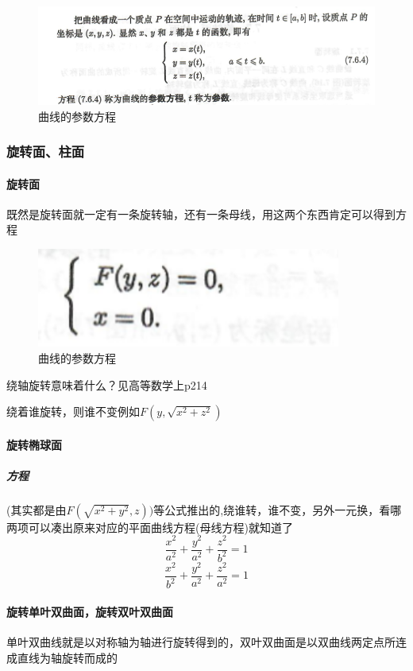 \documentclass[UTF8]{ctexart}
\begin{document}
    \begin{figure}[ht]
      \centering
      \includegraphics[width = 12cm]{../picturenote/参数方程.png}
      \caption{曲线的参数方程}
    \end{figure}


\subsubsection{旋转面、柱面}

\paragraph{旋转面}

既然是旋转面就一定有一条旋转轴，还有一条母线，用这两个东西肯定可以得到方程

  \begin{figure}[ht]
    \centering
    \includegraphics[width = 10cm]{../picturenote/旋转面参数方程.png}
    \caption{曲线的参数方程}
  \end{figure}

绕轴旋转意味着什么？见高等数学上p214

绕着谁旋转，则谁不变例如$F(y,\sqrt{x^2+z^2})$

\paragraph{旋转椭球面}

\subparagraph{方程}(其实都是由$F(\sqrt {x^2+y^2},z))$等公式推出的,绕谁转，谁不变，另外一元换，看哪两项可以凑出原来对应的平面曲线方程(母线方程)就知道了
$$\frac{x^2}{a^2}+\frac{y^2}{a^2}+\frac{z^2}{b^2} = 1$$
$$\frac{x^2}{b^2}+\frac{y^2}{a^2}+\frac{z^2}{a^2} = 1$$

\paragraph{旋转单叶双曲面，旋转双叶双曲面}
单叶双曲线就是以对称轴为轴进行旋转得到的，双叶双曲面是以双曲线两定点所连成直线为轴旋转而成的
\end{document}
